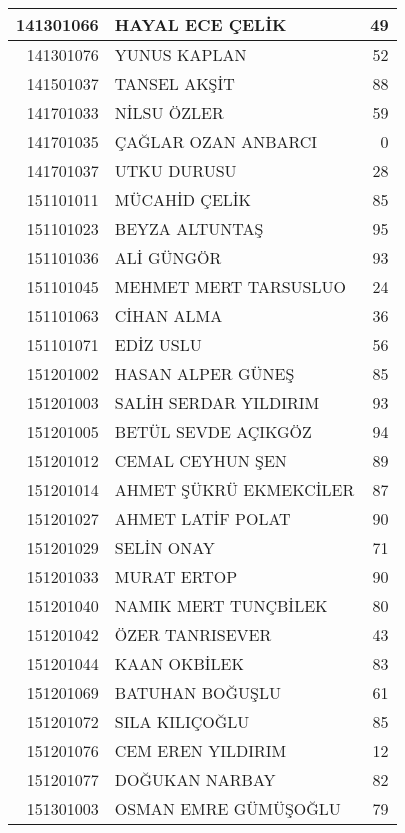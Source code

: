 \documentclass[12pt]{article}
\begin{document}
\begin{multicols}{2}
\begin{longtable}{||r||l||r||}
    \midrule
    141301066 & HAYAL ECE ÇELİK & 49 \\
    \midrule
    141301076 & YUNUS KAPLAN & 52 \\
    \midrule
    141501037 & TANSEL AKŞİT & 88 \\
    \midrule
    141701033 & NİLSU ÖZLER & 59 \\
    \midrule
    141701035 & ÇAĞLAR OZAN ANBARCI & 0 \\
    \midrule
    141701037 & UTKU DURUSU & 28 \\
    \midrule
    151101011 & MÜCAHİD ÇELİK & 85 \\
    \midrule
    151101023 & BEYZA ALTUNTAŞ & 95 \\
    \midrule
    151101036 & ALİ GÜNGÖR & 93 \\
    \midrule
    151101045 & MEHMET MERT TARSUSLUO & 24 \\
    \midrule
    151101063 & CİHAN ALMA & 36 \\
    \midrule
    151101071 & EDİZ USLU & 56 \\
    \midrule
    151201002 & HASAN ALPER GÜNEŞ & 85 \\
    \midrule
    151201003 & SALİH SERDAR YILDIRIM & 93 \\
    \midrule
    151201005 & BETÜL SEVDE AÇIKGÖZ & 94 \\
    \midrule
    151201012 & CEMAL CEYHUN ŞEN & 89 \\
    \midrule
    151201014 & AHMET ŞÜKRÜ EKMEKCİLER & 87 \\
    \midrule
    151201027 & AHMET LATİF POLAT & 90 \\
    \midrule
    151201029 & SELİN ONAY & 71 \\
    \midrule
    151201033 & MURAT ERTOP & 90 \\
    \midrule
    151201040 & NAMIK MERT TUNÇBİLEK & 80 \\
    \midrule
    151201042 & ÖZER TANRISEVER & 43 \\
    \midrule
    151201044 & KAAN OKBİLEK & 83 \\
    \midrule
    151201069 & BATUHAN BOĞUŞLU & 61 \\
    \midrule
    151201072 & SILA KILIÇOĞLU & 85 \\
    \midrule
    151201076 & CEM EREN YILDIRIM & 12 \\
    \midrule
    151201077 & DOĞUKAN NARBAY & 82 \\
    \midrule
    151301003 & OSMAN EMRE GÜMÜŞOĞLU & 79 \\

\end{longtable}
\end{multicols}
\end{document}
